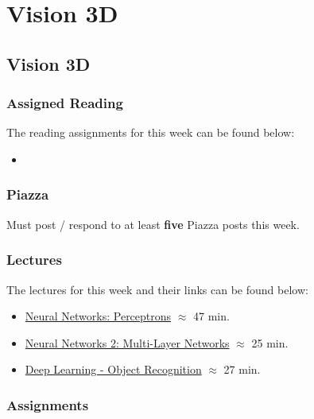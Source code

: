\clearpage

\renewcommand{\ChapTitle}{Vision 3D}
\renewcommand{\SectionTitle}{Vision 3D}

\chapter{\ChapTitle}
\section{\SectionTitle}

\subsection{Assigned Reading}

The reading assignments for this week can be found below:

\begin{itemize}
    \item {}
\end{itemize}

\subsection{Piazza}

Must post / respond to at least \textbf{five} Piazza posts this week.

\subsection{Lectures}

The lectures for this week and their links can be found below:

\begin{itemize}
    \item \href{https://www.youtube.com/watch?v=XAN8u7voWw0}{Neural Networks: Perceptrons} $\approx$ 47 min.
    \item \href{https://www.youtube.com/watch?v=zAXDn4zGXxs}{Neural Networks 2: Multi-Layer Networks} $\approx$ 25 min.
    \item \href{https://www.youtube.com/watch?v=zttSZyM8HPI}{Deep Learning - Object Recognition} $\approx$ 27 min.
\end{itemize}

\subsection{Assignments}

